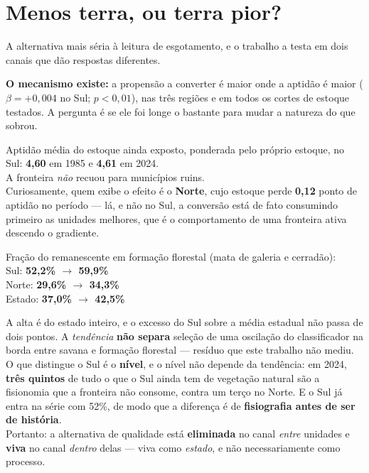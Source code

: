 \section{Menos terra, ou terra pior?}

A alternativa mais séria à leitura de esgotamento, e o trabalho a testa em dois
canais que dão respostas diferentes.

\textbf{O mecanismo existe:} a propensão a converter é maior onde a aptidão é
maior ($\beta = +0{,}004$ no Sul; $p < 0{,}01$), nas três regiões e em todos os
cortes de estoque testados. A pergunta é se ele foi longe o bastante para mudar
a natureza do que sobrou.

\begin{ancora}
Aptidão média do estoque ainda exposto, ponderada pelo próprio estoque, no Sul:
\textbf{4,60} em 1985 e \textbf{4,61} em 2024. \\
A fronteira \emph{não} recuou para municípios ruins. \\[4pt]
Curiosamente, quem exibe o efeito é o \textbf{Norte}, cujo estoque perde
\textbf{0,12} ponto de aptidão no período --- lá, e não no Sul, a conversão está
de fato consumindo primeiro as unidades melhores, que é o comportamento de uma
fronteira ativa descendo o gradiente.
\end{ancora}

\begin{ancora}
Fração do remanescente em formação florestal (mata de galeria e cerradão): \\
Sul: \textbf{52,2\% $\to$ 59,9\%} \\
Norte: \textbf{29,6\% $\to$ 34,3\%} \\
Estado: \textbf{37,0\% $\to$ 42,5\%}
\end{ancora}

\begin{naodiz}
A alta é do estado inteiro, e o excesso do Sul sobre a média estadual não passa
de dois pontos. A \emph{tendência} \textbf{não separa} seleção de uma oscilação
do classificador na borda entre savana e formação florestal --- resíduo que este
trabalho não mediu. \\[4pt]
O que distingue o Sul é o \textbf{nível}, e o nível não depende da tendência: em
2024, \textbf{três quintos} de tudo o que o Sul ainda tem de vegetação natural
são a fisionomia que a fronteira não consome, contra um terço no Norte. E o Sul
já entra na série com 52\%, de modo que a diferença é de \textbf{fisiografia
antes de ser de história}. \\[4pt]
Portanto: a alternativa de qualidade está \textbf{eliminada} no canal
\emph{entre} unidades e \textbf{viva} no canal \emph{dentro} delas --- viva como
\emph{estado}, e não necessariamente como processo.
\end{naodiz}


